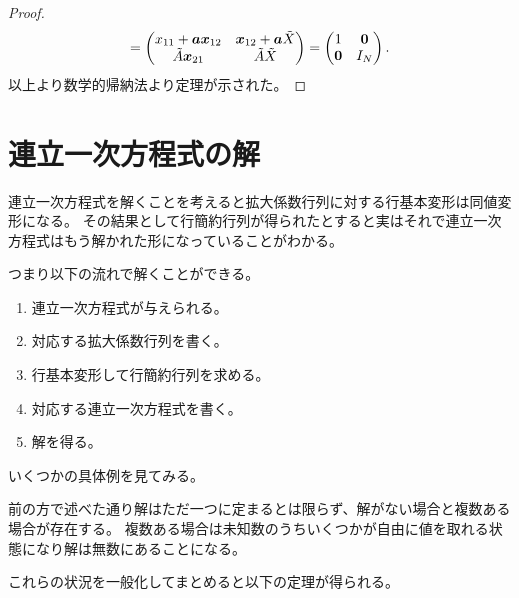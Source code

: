 \begin{proof}
$$= \begin{pmatrix}x_{1 1}+\vb*{a}\vb*{x}_{1 2} & \vb*{x}_{1 2}+\vb*{a}\tilde{X} \\ \tilde{A}\vb*{x}_{2 1} & \tilde{A}\tilde{X}\end{pmatrix}
= \begin{pmatrix}1 & \vb*{0} \\ \vb*{0} & I_N\end{pmatrix}.
$$
以上より数学的帰納法より定理が示された。
\end{proof}

\section{連立一次方程式の解}

連立一次方程式を解くことを考えると拡大係数行列に対する行基本変形は同値変形になる。
その結果として行簡約行列が得られたとすると実はそれで連立一次方程式はもう解かれた形になっていることがわかる。

つまり以下の流れで解くことができる。

\begin{enumerate}
\item
連立一次方程式が与えられる。
\item
対応する拡大係数行列を書く。
\item
行基本変形して行簡約行列を求める。
\item
対応する連立一次方程式を書く。
\item
解を得る。
\end{enumerate}

いくつかの具体例を見てみる。

\begin{example}[連立一次方程式の解法]
\end{example}

前の方で述べた通り解はただ一つに定まるとは限らず、解がない場合と複数ある場合が存在する。
複数ある場合は未知数のうちいくつかが自由に値を取れる状態になり解は無数にあることになる。

\begin{example}[解を持たない場合]
\end{example}

\begin{example}[解が無数にある場合]
\end{example}

これらの状況を一般化してまとめると以下の定理が得られる。

